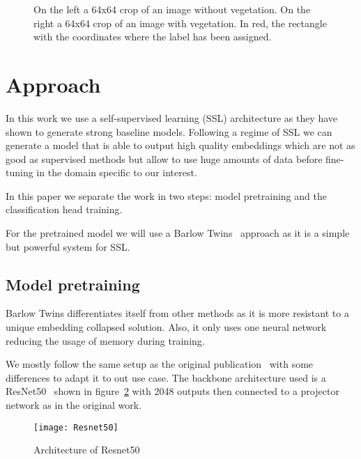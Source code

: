 \documentclass[conference]{IEEEtran}
\begin{document}
    \begin{figure}[h]
        \centering
        \qquad
        \caption{On the left a 64x64 crop of an image without vegetation. On the right a 64x64 crop of an image with vegetation.
        In red, the rectangle with the coordinates where the label has been assigned.}
        \label{fig:vegetation_example}
    \end{figure}


    \section{Approach}
    In this work we use a self-supervised learning (SSL) architecture as they have shown to generate strong baseline models.
    Following a regime of SSL we can generate a model that is able to output high quality embeddings which are not
    as good as supervised methods but allow to use huge amounts of data before fine-tuning in the domain specific to our interest.

    In this paper we separate the work in two steps: model pretraining and the classification head training.

    For the pretrained model we will use a Barlow Twins~\cite{barlowtwins} approach as it is a simple but powerful system for
    SSL.

    \subsection{Model pretraining}
    Barlow Twins differentiates itself from other methods as it is more resistant to a unique embedding collapsed solution.
    Also, it only uses one neural network reducing the usage of memory during training.

    We mostly follow the same setup as the original publication~\cite{barlowtwins} with some differences to adapt it to out use case.
    The backbone architecture used is a ResNet50~\cite{he2015deep} shown in figure~\ref{fig:resnet50} with 2048 outputs then connected to a projector network as in the original work.

    \begin{figure}
        \centering
        \texttt{[image: Resnet50]}
        \caption{Architecture of Resnet50}
        \label{fig:resnet50}
    \end{figure}
\end{document}
